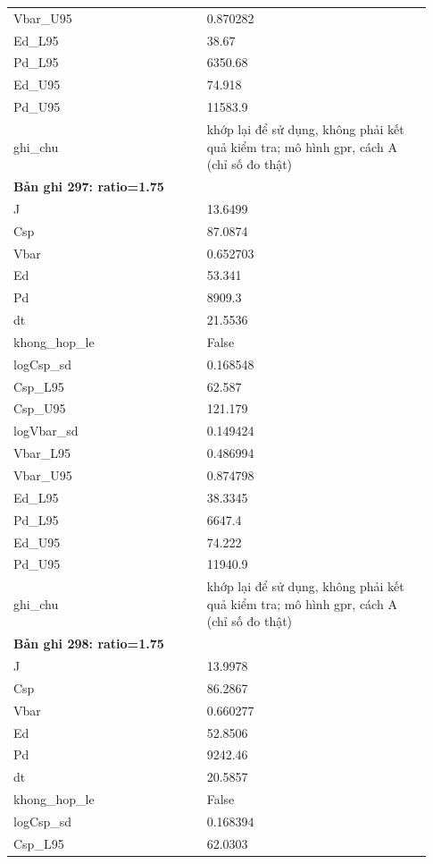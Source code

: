 \begin{longtable}{p{0.43\linewidth}p{0.50\linewidth}}
Vbar\_\allowbreak U95 & 0.870282 \\
Ed\_\allowbreak L95 & 38.67 \\
Pd\_\allowbreak L95 & 6350.68 \\
Ed\_\allowbreak U95 & 74.918 \\
Pd\_\allowbreak U95 & 11583.9 \\
ghi\_\allowbreak chu & khớp lại để sử dụng, không phải kết quả kiểm tra; mô hình gpr, cách A (chỉ số đo thật) \\
\midrule
\multicolumn{2}{p{0.95\linewidth}}{\textbf{Bản ghi 297: ratio=1.75}} \\
J & 13.6499 \\
Csp & 87.0874 \\
Vbar & 0.652703 \\
Ed & 53.341 \\
Pd & 8909.3 \\
dt & 21.5536 \\
khong\_\allowbreak hop\_\allowbreak le & False \\
logCsp\_\allowbreak sd & 0.168548 \\
Csp\_\allowbreak L95 & 62.587 \\
Csp\_\allowbreak U95 & 121.179 \\
logVbar\_\allowbreak sd & 0.149424 \\
Vbar\_\allowbreak L95 & 0.486994 \\
Vbar\_\allowbreak U95 & 0.874798 \\
Ed\_\allowbreak L95 & 38.3345 \\
Pd\_\allowbreak L95 & 6647.4 \\
Ed\_\allowbreak U95 & 74.222 \\
Pd\_\allowbreak U95 & 11940.9 \\
ghi\_\allowbreak chu & khớp lại để sử dụng, không phải kết quả kiểm tra; mô hình gpr, cách A (chỉ số đo thật) \\
\midrule
\multicolumn{2}{p{0.95\linewidth}}{\textbf{Bản ghi 298: ratio=1.75}} \\
J & 13.9978 \\
Csp & 86.2867 \\
Vbar & 0.660277 \\
Ed & 52.8506 \\
Pd & 9242.46 \\
dt & 20.5857 \\
khong\_\allowbreak hop\_\allowbreak le & False \\
logCsp\_\allowbreak sd & 0.168394 \\
Csp\_\allowbreak L95 & 62.0303 \\

\end{longtable}
